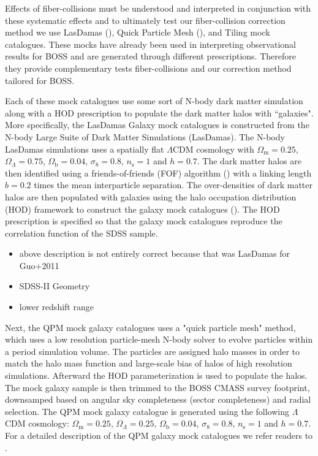 \documentclass{emulateapj}
\begin{document}
Effects of fiber-collisions must be understood and interpreted in conjunction with these systematic effects and to ultimately test our fiber-collision correction method we use LasDamas (\citealt{McBride:2009aa}), Quick Particle Mesh (\citealt{White:2014aa}), and Tiling mock catalogues. These mocks have already been used in interpreting observational results for BOSS and are generated through different prescriptions. Therefore they provide complementary tests fiber-collisions and our correction method tailored for BOSS. 

Each of these mock catalogues use some sort of N-body dark matter simulation along with a HOD prescription to populate the dark matter halos with ``galaxies". More specifically, the LasDamas Galaxy mock catalogues is constructed from the N-body Large Suite of Dark Matter Simulations (LasDamas). The N-body LasDamas simulations uses a spatially flat $\Lambda$CDM cosmology with $\Omega_\mathrm{m} = 0.25$, $\Omega_\Lambda = 0.75$, $\Omega_\mathrm{b} = 0.04$, $\sigma_8 = 0.8$, $n_\mathrm{s} = 1$ and $h=0.7$. The dark matter halos are then identified using a friends-of-friends (FOF) algorithm (\citealt{Davis:1985aa}) with a linking length $b = 0.2 $ times the mean interparticle separation. The over-densities of dark matter halos are then populated with galaxies using the halo occupation distribution (HOD) framework to construct the galaxy mock catalogues (\citealt{McBride:2009aa}). The HOD prescription is specified so that the galaxy mock catalogues reproduce the correlation function of the SDSS sample. %
\begin{itemize}
\item above description is not entirely correct because that was LasDamas for Guo+2011
\item SDSS-II Geometry
\item lower redshift range
\end{itemize}

Next, the QPM mock galaxy catalogues uses a "quick particle mesh" method, which uses a low resolution particle-mesh N-body solver to evolve particles within a period simulation volume. The particles are assigned halo masses  in order to match the halo mass function and large-scale bias of halos of high resolution simulations. Afterward the \cite{Tinker:2012aa} HOD parameterization is used to populate the halos. The mock galaxy sample is then trimmed to the BOSS CMASS survey footprint, downsamped based on angular sky completeness (sector completeness) and radial selection. The QPM mock galaxy catalogue is generated using the following $\Lambda$CDM cosmology: $\Omega_\mathrm{m} = 0.25$, $\Omega_\Lambda = 0.25$, $\Omega_\mathrm{b} = 0.04$, $\sigma_8 = 0.8$, $n_\mathrm{s} = 1$ and $h=0.7$. For a detailed description of the QPM galaxy mock catalogues we refer readers to \cite{White:2014aa}. 
\end{document}

